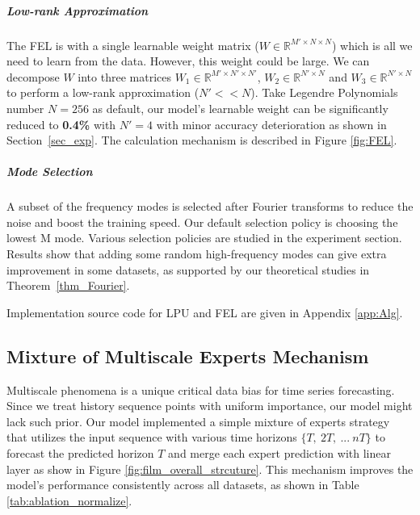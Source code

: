 \documentclass{article}
\begin{document}
\subparagraph{Low-rank Approximation} The FEL is with a single learnable weight matrix ($W \in \mathbb{R}^{M' \times N \times N}$) which is all we need to learn from the data. However, this weight could be large. We can decompose $W$ into three matrices $W_1 \in \mathbb{R}^{M' \times N' \times N'}$, $W_2 \in \mathbb{R}^{N' \times N}$ and $W_3 \in \mathbb{R}^{N' \times N}$ to perform a low-rank approximation ($N' << N$). Take Legendre Polynomials number $N=256$ as default, our model's learnable weight can be significantly reduced to \textbf{0.4\%} with $N'=4$ with minor accuracy deterioration as shown in Section~\ref{sec_exp}. The calculation mechanism is described in Figure \ref{fig:FEL}.


\subparagraph{Mode Selection}
A subset of the frequency modes is selected after Fourier transforms to reduce the noise and boost the training speed. Our default selection policy is choosing the lowest M mode. Various selection policies are studied in the experiment section. Results show that adding some random high-frequency modes can give extra improvement in some datasets, as supported by our theoretical studies in Theorem~\ref{thm_Fourier}.

Implementation source code for LPU and FEL are given in Appendix \ref{app:Alg}.


\subsection{Mixture of Multiscale Experts Mechanism}\vspace{-1mm}
Multiscale phenomena is a unique critical data bias for time series forecasting. Since we treat history sequence points with uniform importance, our model might lack such prior. Our model implemented a simple mixture of experts strategy that utilizes the input sequence with various time horizons $\{T,\ 2T,\ ...\ nT\}$ to forecast the predicted horizon $T$ and merge each expert prediction with linear layer as show in Figure \ref{fig:film_overall_strcuture}. This mechanism improves the model's performance consistently across all datasets, as shown in Table \ref{tab:ablation_normalize}.
\end{document}
